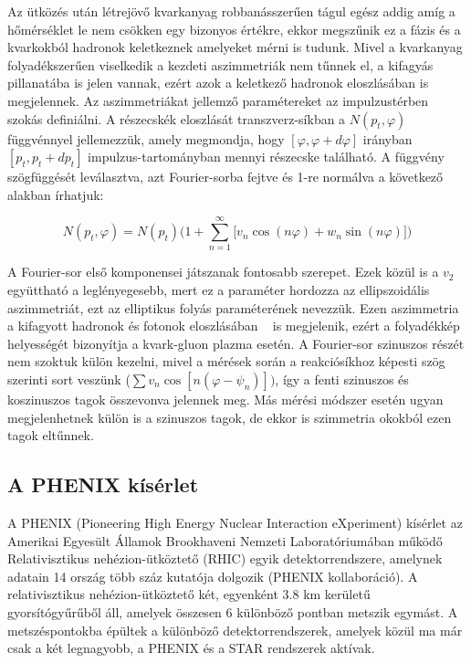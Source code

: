 \documentclass[11pt,a4paper]{article}
\numberwithin{equation}{subsection}
\numberwithin{figure}{section}
\begin{document}
Az ütközés után létrejövő kvarkanyag robbanásszerűen tágul egész addig amíg a hőmérséklet le nem csökken egy bizonyos értékre, ekkor megszűnik ez a fázis és a kvarkokból hadronok keletkeznek amelyeket mérni is tudunk. Mivel a kvarkanyag folyadékszerűen viselkedik a kezdeti aszimmetriák nem tűnnek el, a kifagyás pillanatába is jelen vannak, ezért azok a keletkező hadronok eloszlásában is megjelennek. Az aszimmetriákat jellemző paramétereket az impulzustérben szokás definiálni. A részecskék eloszlását transzverz-síkban a $N(p_t, \varphi)$ függvénnyel jellemezzük, amely megmondja, hogy $[\varphi, \varphi+d\varphi]$ irányban $[p_t, p_t+dp_t]$ impulzus-tartományban mennyi részecske található. A függvény szögfüggését leválasztva, azt Fourier-sorba fejtve és 1-re normálva a következő alakban írhatjuk:
 \begin{large}
\begin{equation}
N(p_t, \varphi)= N(p_t)\bigg(1+\sum_{n=1}^{\infty}\Big[v_n \cos(n\varphi)+w_n \sin(n\varphi)\Big]\bigg)
\label{eq:e3}
\end{equation}
\end{large}
A Fourier-sor első komponensei játszanak fontosabb szerepet. Ezek közül is a $v_2$ együttható a leglényegesebb, mert ez a paraméter hordozza az ellipszoidális aszimmetriát, ezt az elliptikus folyás paraméterének nevezzük. Ezen aszimmetria a kifagyott hadronok és fotonok eloszlásában ~\cite{Adare:2011zr} is megjelenik, ezért a folyadékkép helyességét bizonyítja a kvark-gluon plazma esetén.
A Fourier-sor szinuszos részét nem szoktuk külön kezelni, mivel a mérések során a reakciósíkhoz képesti szög szerinti sort veszünk ($\sum v_n \cos[n(\varphi-\psi_n)])$, így a fenti szinuszos és koszinuszos tagok összevonva jelennek meg. Más mérési módszer esetén ugyan megjelenhetnek külön is a szinuszos tagok, de ekkor is szimmetria okokból ezen tagok eltűnnek.


\subsection{A PHENIX kísérlet}

A PHENIX (Pioneering
High Energy Nuclear Interaction eXperiment) kísérlet az Amerikai Egyesült Államok  Brookhaveni Nemzeti Laboratóriumában működő Relativisztikus nehézion-ütköztető (RHIC) egyik detektorrendszere, amelynek adatain 14 ország több száz kutatója dolgozik (PHENIX kollaboráció). A relativisztikus nehézion-ütköztető két, egyenként $3.8$ km kerületű gyorsítógyűrűből áll, amelyek összesen 6 különböző pontban metszik egymást. A metszéspontokba épültek a különböző detektorrendszerek, amelyek közül ma már csak a két legnagyobb, a PHENIX és a STAR rendszerek aktívak.
\end{document}
